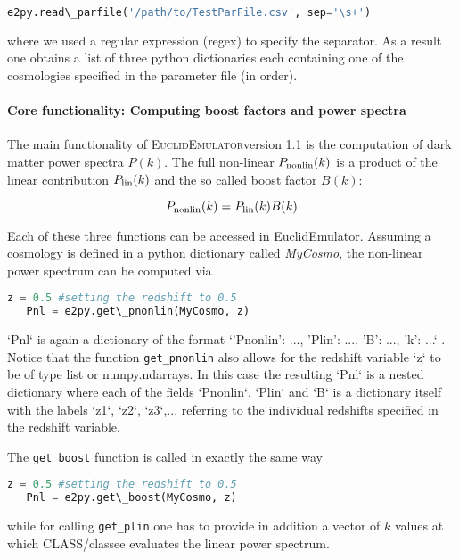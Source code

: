 \documentclass[american,11pt]{article}
\def\code#1{\texttt{#1}}
\begin{document}
\begin{lstlisting}[language=python]
   e2py.read\_parfile('/path/to/TestParFile.csv', sep='\s+')
\end{lstlisting}
where we used a regular expression (regex) to specify the separator. As a result one obtains a list of three python dictionaries each containing one of the cosmologies specified in the parameter file (in order).

\paragraph{Core functionality: Computing boost factors and power spectra}
The main functionality of \textsc{EuclidEmulator}version 1.1 is the computation of dark matter power spectra $P(k)$. The full non-linear $P_{\rm nonlin}(k)$ is a product of the linear contribution $P_{\rm lin}(k)$ and the so called boost factor $B(k)$:

\begin{equation}
P_{\rm nonlin}(k) = P_{\rm lin}(k) B(k)
\end{equation}

Each of these three functions can be accessed in EuclidEmulator. Assuming a cosmology is defined in a python dictionary called \textit{MyCosmo}, the non-linear power spectrum can be computed via

\begin{lstlisting}[language=python]
   z = 0.5 #setting the redshift to 0.5
   Pnl = e2py.get\_pnonlin(MyCosmo, z)
\end{lstlisting}

`Pnl` is again a dictionary of the format `{'Pnonlin': ..., 'Plin': ..., 'B': ..., 'k': ...}` . Notice that the function  \code{get\_pnonlin} also allows for the redshift variable `z` to be of type list or numpy.ndarrays. In this case the resulting `Pnl` is a nested dictionary where each of the fields `Pnonlin`, `Plin` and `B` is a dictionary itself with the labels `z1`, `z2`, `z3`,... referring to the individual redshifts specified in the redshift variable.

The  \code{get\_boost} function is called in exactly the same way

\begin{lstlisting}[language=python]
   z = 0.5 #setting the redshift to 0.5
   Pnl = e2py.get\_boost(MyCosmo, z)
\end{lstlisting}

while for calling  \code{get\_plin} one has to provide in addition a vector of $k$ values at which CLASS/classee evaluates the linear power spectrum.
\end{document}
